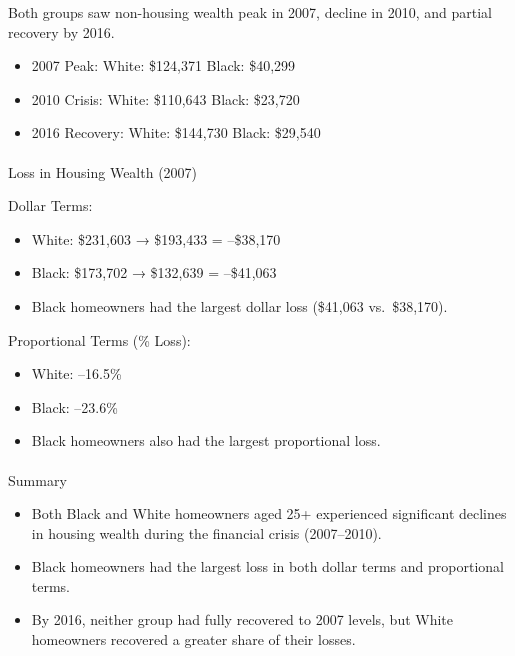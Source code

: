 \documentclass[
  12pt]{article}
\makeatletter
\let\oldparagraph\paragraph
\renewcommand{\paragraph}{
    \@ifstar
      \xxxParagraphStar
      \xxxParagraphNoStar
  }
\newcommand{\xxxParagraphStar}[1]{\oldparagraph*{#1}\mbox{}}
\newcommand{\xxxParagraphNoStar}[1]{\oldparagraph{#1}\mbox{}}
\providecommand{\tightlist}{%
  \setlength{\itemsep}{0pt}\setlength{\parskip}{0pt}}\usepackage{longtable,booktabs,array}
\makeatother
\begin{document}
Both groups saw non-housing wealth peak in 2007, decline in 2010, and
partial recovery by 2016.

\begin{itemize}
\tightlist
\item
  2007 Peak: White: \$124,371 \textbar{} Black: \$40,299
\item
  2010 Crisis: White: \$110,643 \textbar{} Black: \$23,720
\item
  2016 Recovery: White: \$144,730 \textbar{} Black: \$29,540
\end{itemize}

\paragraph{Loss in Housing Wealth
(2007)}\label{loss-in-housing-wealth-2007}

Dollar Terms:

\begin{itemize}
\tightlist
\item
  White: \$231,603 → \$193,433 = --\$38,170
\item
  Black: \$173,702 → \$132,639 = --\$41,063
\item
  Black homeowners had the largest dollar loss (\$41,063 vs.~\$38,170).
\end{itemize}

Proportional Terms (\% Loss):

\begin{itemize}
\tightlist
\item
  White: --16.5\%
\item
  Black: --23.6\%
\item
  Black homeowners also had the largest proportional loss.
\end{itemize}

\paragraph{Summary}\label{summary}

\begin{itemize}
\tightlist
\item
  Both Black and White homeowners aged 25+ experienced significant
  declines in housing wealth during the financial crisis (2007--2010).
\item
  Black homeowners had the largest loss in both dollar terms and
  proportional terms.
\item
  By 2016, neither group had fully recovered to 2007 levels, but White
  homeowners recovered a greater share of their losses.
\end{itemize}
\end{document}
